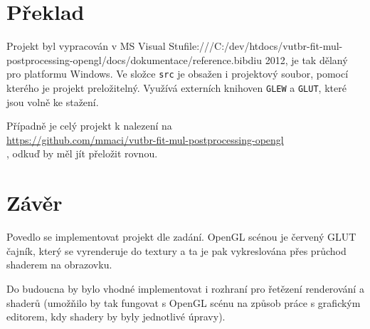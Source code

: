 \documentclass[12pt,a4paper,titlepage,final]{report}
\begin{document}
\section{Překlad}

Projekt byl vypracován v MS Visual Stufile:///C:/dev/htdocs/vutbr-fit-mul-postprocessing-opengl/docs/dokumentace/reference.bibdiu 2012, je tak dělaný pro platformu Windows. Ve složce \verb|src| je obsažen i projektový soubor, pomocí kterého je projekt preložitelný. Využívá externích knihoven \verb|GLEW| a \verb|GLUT|, které jsou volně ke stažení.

Případně je celý projekt k nalezení na \\
 \url{https://github.com/mmaci/vutbr-fit-mul-postprocessing-opengl} \\
, odkuď by měl jít přeložit rovnou.




\section{Závěr}

Povedlo se implementovat projekt dle zadání. OpenGL scénou je červený GLUT čajník, který se vyrenderuje do textury a ta je pak vykreslována přes průchod shaderem na obrazovku.

Do budoucna by bylo vhodné implementovat i rozhraní pro řetězení renderování a shaderů (umožňilo by tak fungovat s OpenGL scénu na způsob práce s grafickým editorem, kdy shadery by byly jednotlivé úpravy).



\nocite{cite1}
\nocite{cite2}
\nocite{cite3}
\nocite{cite4}
\nocite{cite5}

\hypertarget{bib}{}

\end{document}
